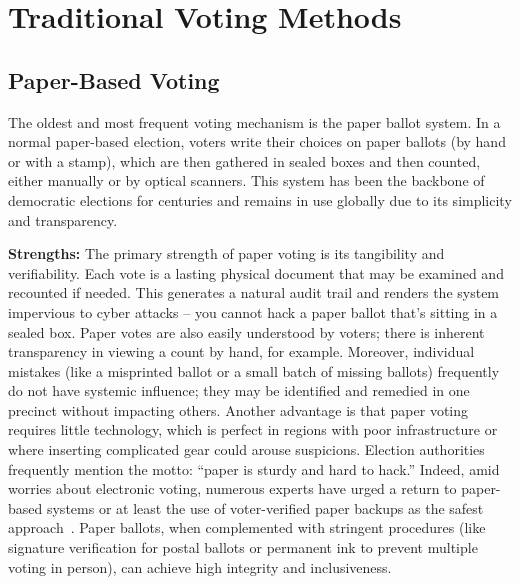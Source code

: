 \documentclass[a4paper,10pt]{report}
\begin{document}
\section{Traditional Voting Methods}

\subsection{Paper-Based Voting}

The oldest and most frequent voting mechanism is the paper ballot system.   In a normal paper-based election, voters write their choices on paper ballots (by hand or with a stamp), which are then gathered in sealed boxes and then counted, either manually or by optical scanners.   This system has been the backbone of democratic elections for centuries and remains in use globally due to its simplicity and transparency.

  \textbf  {Strengths:}   The primary strength of paper voting is its tangibility and verifiability.   Each vote is a lasting physical document that may be examined and recounted if needed.   This generates a natural audit trail and renders the system impervious to cyber attacks -- you cannot hack a paper ballot that’s sitting in a sealed box.   Paper votes are also easily understood by voters; there is inherent transparency in viewing a count by hand, for example.   Moreover, individual mistakes (like a misprinted ballot or a small batch of missing ballots) frequently do not have systemic influence; they may be identified and remedied in one precinct without impacting others.   Another advantage is that paper voting requires little technology, which is perfect in regions with poor infrastructure or where inserting complicated gear could arouse suspicions.   Election authorities frequently mention the motto: ``paper is sturdy and hard to hack.''   Indeed, amid worries about electronic voting, numerous experts have urged a return to paper-based systems or at least the use of voter-verified paper backups as the safest approach~\cite{brookings2018paper}.   Paper ballots, when complemented with stringent procedures (like signature verification for postal ballots or permanent ink to prevent multiple voting in person), can achieve high integrity and inclusiveness.
\end{document}
